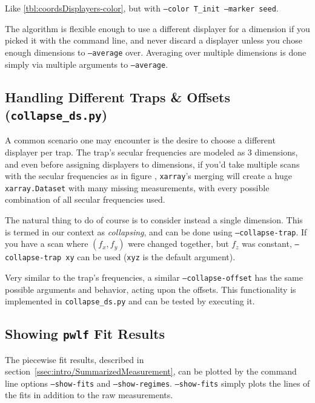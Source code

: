 \begin{table}[h]

\caption{Like \ref{tbl:coordsDisplayers-color}, but with \texttt{--color T\_init --marker seed}.}
\label{tbl:coordsDisplayers-color-marker}
\end{table}

The algorithm is flexible enough to use a different displayer for a dimension if you picked it with the command line, and never discard a displayer unless you chose enough dimensions to \texttt{--average} over. Averaging over multiple dimensions is done simply via multiple arguments to \texttt{--average}.

\subsection{Handling Different Traps \& Offsets (\texttt{collapse\_ds.py})}

A common scenario one may encounter is the desire to choose a different displayer per trap. The trap's secular frequencies are modeled as 3 dimensions, and even before assigning displayers to dimensions, if you'd take multiple scans with the secular frequencies as in figure%
, \texttt{xarray}'s merging will create a huge \texttt{xarray.Dataset} with many missing measurements, with every possible combination of all secular frequencies used.

The natural thing to do of course is to consider instead a single dimension. This is termed in our context as \textit{collapsing}, and can be done using \texttt{--collapse-trap}. If you have a scan where $(f_x, f_y)$ were changed together, but $f_z$ was constant, \texttt{--collapse-trap xy} can be used (\texttt{xyz} is the default argument).

Very similar to the trap's frequencies, a similar \texttt{--collapse-offset} has the same possible arguments and behavior, acting upon the offsets. This functionality is implemented in \texttt{collapse\_ds.py} and can be tested by executing it.

\subsection{Showing \texttt{pwlf} Fit Results}

The piecewise fit results, described in section~\ref{ssec:intro/SummarizedMeasurement}, can be plotted by the command line options \texttt{--show-fits} and \texttt{--show-regimes}. \texttt{--show-fits} simply plots the lines of the fits in addition to the raw measurements.

